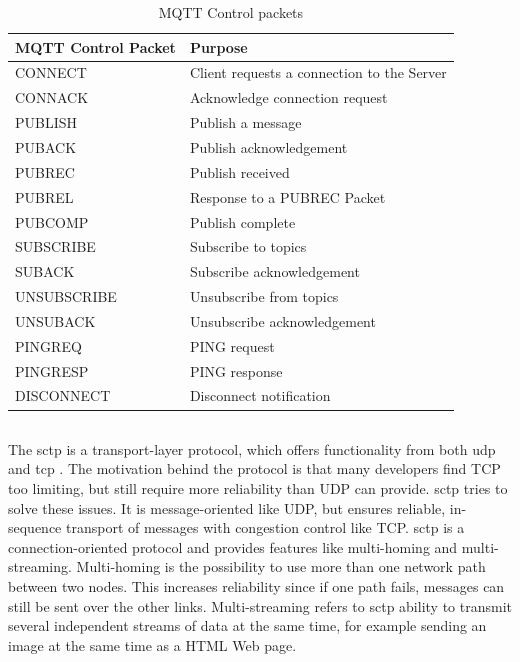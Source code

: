 \begin{table}[h]
\begin{tabularx}{\textwidth}{| X | X |}
\hline
  \textbf{MQTT Control Packet} & \textbf{Purpose} \\ \hline
  CONNECT & Client requests a connection to the Server \\ \hline
  CONNACK & Acknowledge connection request \\ \hline
  PUBLISH & Publish a message \\ \hline
  PUBACK & Publish acknowledgement \\ \hline
  PUBREC &  Publish received \\ \hline
  PUBREL & Response to a PUBREC Packet \\ \hline
  PUBCOMP & Publish complete \\ \hline
  SUBSCRIBE & Subscribe to topics \\ \hline
  SUBACK & Subscribe acknowledgement\\ \hline
  UNSUBSCRIBE & Unsubscribe from topics\\ \hline
  UNSUBACK & Unsubscribe acknowledgement \\ \hline
  PINGREQ & PING request \\ \hline
  PINGRESP & PING response \\ \hline
  DISCONNECT & Disconnect notification \\ \hline
\end{tabularx}
\caption{MQTT Control packets}
\label{table:mqtt-packets}
\end{table}


\subsection{}

The \gls{sctp} is a transport-layer protocol, which offers functionality from
both \gls{udp} and \gls{tcp} \cite{rfc-sctp}. The motivation behind the protocol
is that many developers find TCP too limiting, but still require more
reliability than UDP can provide. \gls{sctp} tries to solve these issues. It is
message-oriented like UDP, but ensures reliable, in-sequence transport of
messages with congestion control like TCP. \gls{sctp} is a connection-oriented
protocol and provides features like multi-homing and multi-streaming.
Multi-homing is the possibility to use more than one network path between two
nodes. This increases reliability since if one path fails, messages can still be
sent over the other links. Multi-streaming refers to \gls{sctp} ability to
transmit several independent streams of data at the same time, for example
sending an image at the same time as a HTML Web page.

